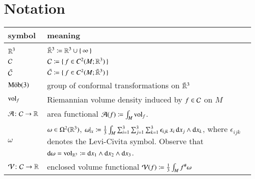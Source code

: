 \section{Notation}\label{sec:Notation}


\noindent
{}

\noindent
{}

\bigskip

\begin{tabular}{p{4cm}|p{\textwidth-5cm}}
\textbf{symbol} & \textbf{meaning}
\\
\hline
\\
${{\mathbb{R}}^{3}}$
&
${\bar{{\mathbb{R}}}^{3}} \coloneqq {{\mathbb{R}}^{3}}  \cup \set{\infty}$
\\
$\mathcal{C}$
&
$\ConfSpace \ceq \set{f \in \Holder[2][][M][\AmbSpace]}$
\\
$\bar{\mathcal{C}}$
&
$\ExtendedConfSpace \ceq \set{f \in \Holder[2][][M][\ExtendedAmbSpace]}$
\\
$\mathrm{M\ddot{o}b}(3)$
&
group of conformal transformations on ${\bar{{\mathbb{R}}}^{3}}$
\\
$\operatorname{vol}_f$
&
Riemannian volume density induced by $f \in \mathcal{C}$ on $M$
\\
$\operatorname{\mathcal{A}} \colon \mathcal{C} \to {\mathbb{R}}$
&
area functional $\operatorname{\mathcal{A}}(f) \coloneqq \int_M \operatorname{vol}_f$.
\\
$\omega$
&
$\omega \in \Omega^2({{\mathbb{R}}^{3}})$,
$
	\omega |_x \coloneqq \frac{1}{3} \int_M \sum_{i=1}^3\sum_{j=1}^3\sum_{k=1}^3 \epsilon_{ijk} \, x_i \, {\operatorname{d}} x_j \wedge {\operatorname{d}} x_k$, where $\epsilon_{ijk}$ denotes the Levi-Civita symbol.
	 Observe that ${\operatorname{d}} \omega = \operatorname{vol}_{{{\mathbb{R}}^{3}}} \coloneqq {\operatorname{d}} x_1 \wedge {\operatorname{d}} x_2 \wedge {\operatorname{d}} x_3$.
\\
$\operatorname{\mathcal{V}} \colon \mathcal{C} \to {\mathbb{R}}$
&
enclosed volume functional 
$\operatorname{\mathcal{V}}(f) \coloneqq \frac{1}{3} \int_M f^\# \omega$
\\
\end{tabular}